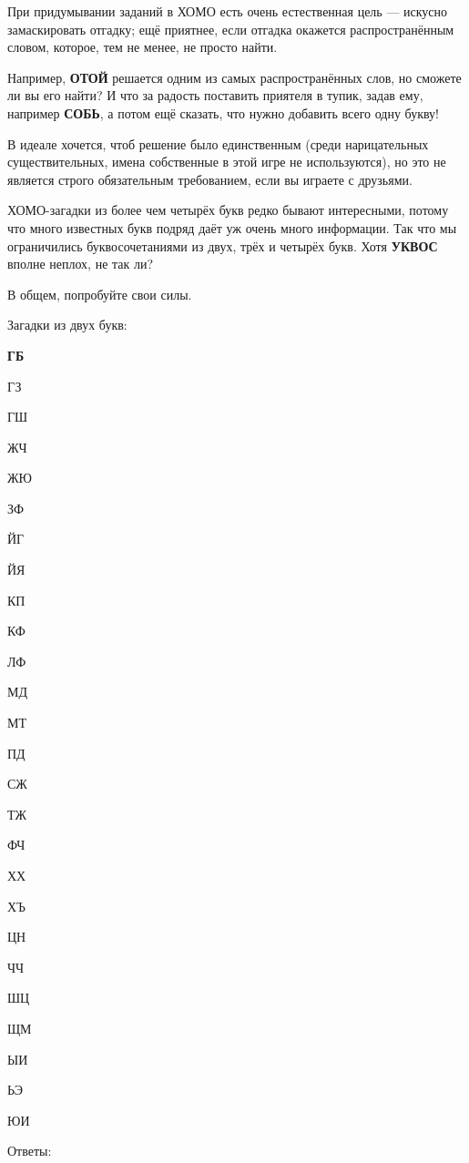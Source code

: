 При придумывании заданий в ХОМО есть очень естественная цель --- искусно замаскировать отгадку;
ещё приятнее, если отгадка окажется распространённым словом, которое, тем не менее, не просто найти.

Например, \textbf{ОТОЙ} решается одним из самых распространённых слов, но сможете ли вы его найти?
И что за радость поставить приятеля в тупик, задав ему, например \textbf{СОБЬ}, а потом ещё сказать, что нужно добавить всего одну букву!

В идеале хочется, чтоб решение было единственным (среди нарицательных существительных, имена собственные в этой игре не используются), но это не является строго обязательным требованием, если вы играете с друзьями.

ХОМО-загадки из более чем четырёх букв редко бывают интересными, потому что много известных букв подряд даёт уж очень много информации.
Так что мы ограничились буквосочетаниями из двух, трёх и четырёх букв.
Хотя \textbf{УКВОС} вполне неплох, не так ли?

В общем, попробуйте свои силы.

Загадки из двух букв:

\begin{multicols}{4}
{\bf
ГБ

ГЗ

ГШ

ЖЧ

ЖЮ

ЗФ

ЙГ

ЙЯ

КП

КФ

ЛФ

МД

МТ

ПД

СЖ

ТЖ

ФЧ

ХХ

ХЪ

ЦН

ЧЧ

ШЦ

ЩМ

ЫИ

ЬЭ

ЮИ
}
\end{multicols}

Ответы:

